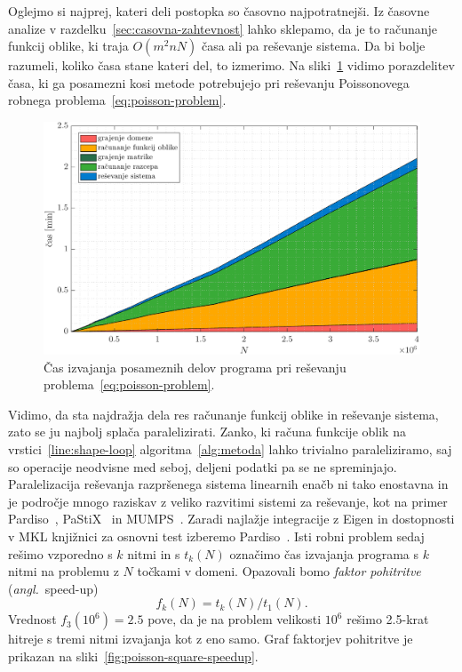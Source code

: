 \documentclass[12pt,a4paper,twoside]{article}
\theoremstyle{definition} %
\theoremstyle{plain} %
\numberwithin{equation}{section}
\newcommand{\ang}[1]{(\textit{angl.}\ #1)}
\newlength{\iw}
\begin{document}
Oglejmo si najprej, kateri deli postopka so časovno najpotratnejši. Iz časovne analize v
razdelku~\ref{sec:casovna-zahtevnost} lahko sklepamo, da je to računanje funkcij oblike,
ki traja $O(m^2n N)$ časa ali pa reševanje sistema. Da bi bolje razumeli, koliko časa stane kateri
del, to izmerimo. Na sliki~\ref{fig:poisson-square-time-distribution} vidimo porazdelitev časa, ki ga posamezni
kosi metode potrebujejo pri reševanju Poissonovega robnega problema~\eqref{eq:poisson-problem}.

\begin{figure}[h!]
  \centering
  \includegraphics[width=\iw]{images/poisson_square_time_distribution_1.pdf}
  \caption[Čas izvajanja delov programa pri reševanju Poissonove enačbe.]{Čas
  izvajanja posameznih delov programa pri reševanju
  problema~\eqref{eq:poisson-problem}.}
  \label{fig:poisson-square-time-distribution}
\end{figure}

Vidimo, da sta najdražja dela res računanje funkcij oblike in reševanje sistema, zato se ju najbolj
splača paralelizirati. Zanko, ki računa funkcije oblik na vrstici~\ref{line:shape-loop}
algoritma~\ref{alg:metoda} lahko trivialno paraleliziramo, saj so operacije neodvisne med seboj,
deljeni podatki pa se ne spreminjajo. Paralelizacija reševanja razpršenega sistema linearnih enačb
ni tako enostavna in je področje mnogo raziskav z veliko razvitimi sistemi za reševanje, kot na
primer Pardiso~\cite{pardiso}, PaStiX~\cite{henon2002pastix} in MUMPS~\cite{amestoy2000mumps}.
Zaradi najlažje integracije z Eigen in dostopnosti v MKL knjižnici za osnovni test izberemo
Pardiso~\cite{pardiso}.  Isti robni problem sedaj rešimo vzporedno s $k$ nitmi in s $t_k(N)$
označimo čas izvajanja programa s $k$ nitmi na problemu z $N$ točkami v domeni.
Opazovali bomo \emph{faktor pohitritve} \ang{speed-up}
\[
  f_k(N) = t_k(N) / t_1(N).
\]
Vrednost $f_3(10^6) = 2.5$ pove, da je na problem velikosti $10^6$ rešimo 2.5-krat hitreje s tremi
nitmi izvajanja kot z eno samo. Graf faktorjev pohitritve je prikazan na
sliki~\ref{fig:poisson-square-speedup}.
\end{document}
